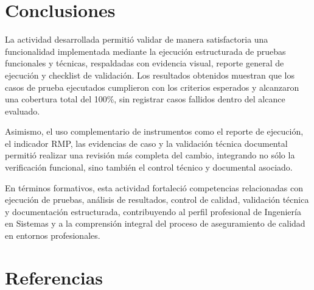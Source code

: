 \documentclass[12pt]{article}
\begin{document}
\section*{Conclusiones}

La actividad desarrollada permitió validar de manera satisfactoria una funcionalidad implementada mediante la ejecución estructurada de pruebas funcionales y técnicas, respaldadas con evidencia visual, reporte general de ejecución y checklist de validación. Los resultados obtenidos muestran que los casos de prueba ejecutados cumplieron con los criterios esperados y alcanzaron una cobertura total del 100\%, sin registrar casos fallidos dentro del alcance evaluado.

Asimismo, el uso complementario de instrumentos como el reporte de ejecución, el indicador RMP, las evidencias de caso y la validación técnica documental permitió realizar una revisión más completa del cambio, integrando no sólo la verificación funcional, sino también el control técnico y documental asociado.

En términos formativos, esta actividad fortaleció competencias relacionadas con ejecución de pruebas, análisis de resultados, control de calidad, validación técnica y documentación estructurada, contribuyendo al perfil profesional de Ingeniería en Sistemas y a la comprensión integral del proceso de aseguramiento de calidad en entornos profesionales.

\section*{Referencias}
\end{document}
